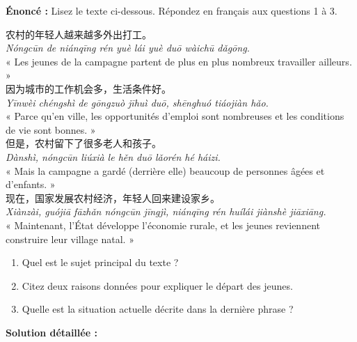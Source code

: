\documentclass[11pt]{article}
\begin{document}
\begin{exoresolu}
\textbf{Énoncé :} Lisez le texte ci-dessous. Répondez en français aux questions 1 à 3.

\begin{textebox}
农村的年轻人越来越多外出打工。\\
\emph{Nóngcūn de niánqīng rén yuè lái yuè duō wàichū dǎgōng.}\\
« Les jeunes de la campagne partent de plus en plus nombreux travailler ailleurs. »\\
因为城市的工作机会多，生活条件好。\\
\emph{Yīnwèi chéngshì de gōngzuò jīhuì duō, shēnghuó tiáojiàn hǎo.}\\
« Parce qu'en ville, les opportunités d'emploi sont nombreuses et les conditions de vie sont bonnes. »\\
但是，农村留下了很多老人和孩子。\\
\emph{Dànshì, nóngcūn liúxià le hěn duō lǎorén hé háizi.}\\
« Mais la campagne a gardé (derrière elle) beaucoup de personnes âgées et d'enfants. »\\
现在，国家发展农村经济，年轻人回来建设家乡。\\
\emph{Xiànzài, guójiā fāzhǎn nóngcūn jīngjì, niánqīng rén huílái jiànshè jiāxiāng.}\\
« Maintenant, l'État développe l'économie rurale, et les jeunes reviennent construire leur village natal. »
\end{textebox}

\begin{enumerate}
    \item Quel est le sujet principal du texte ?
    \item Citez deux raisons données pour expliquer le départ des jeunes.
    \item Quelle est la situation actuelle décrite dans la dernière phrase ?
\end{enumerate}

\tcblower
\textbf{Solution détaillée :}


\end{exoresolu}
\end{document}
